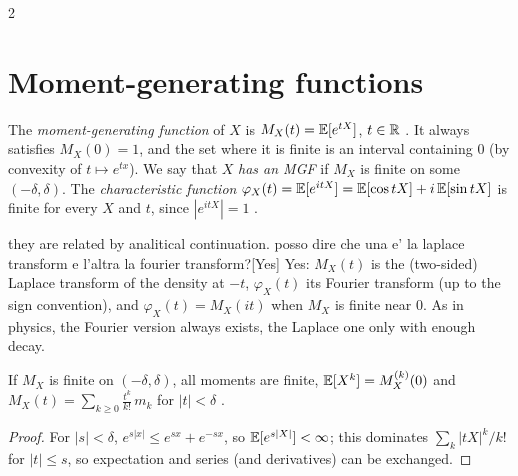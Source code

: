 \begin{paracol}{2}
\section{Moment-generating functions}\label{ch03:sec-mgf}

\begin{definition}
The \emph{moment-generating function} of $X$ is $M_X(t)=\mathbb{E}[e^{tX}]$, $t\in\mathbb{R}$ .
It always satisfies $M_X(0)=1$, and the set where it is finite is an interval containing $0$ (by
convexity of $t\mapsto e^{tx}$). We say that $X$ \emph{has an MGF} if $M_X$ is finite on some
$(-\delta,\delta)$. The \emph{characteristic function} $\varphi_X(t)=\mathbb{E}[e^{itX}]=\mathbb{E}[\cos tX]+i\,\mathbb{E}[\sin tX]$
is finite for every $X$ and $t$, since $|e^{itX}|=1$ .
\end{definition}\begin{answer}{they are related by analitical continuation. posso dire che una e' la laplace transform e l'altra la fourier transform?}[Yes]
Yes: $M_X(t)$ is the (two-sided) Laplace transform of the density at $-t$, $\varphi_X(t)$ its Fourier
transform (up to the sign convention), and $\varphi_X(t)=M_X(it)$ when $M_X$ is finite near 0. As in
physics, the Fourier version always exists, the Laplace one only with enough decay.
\end{answer}

\begin{proposition}
If $M_X$ is finite on $(-\delta,\delta)$, all moments are finite, $\mathbb{E}[X^k]=M_X^{(k)}(0)$ and
$M_X(t)=\sum_{k\ge0}\frac{t^k}{k!}\,m_k$ for $|t|<\delta$ .
\end{proposition}
\begin{proof}
For $|s|<\delta$, $e^{s|x|}\le e^{sx}+e^{-sx}$, so $\mathbb{E}[e^{s|X|}]<\infty$; this dominates $\sum_k|tX|^k/k!$ for
$|t|\le s$, so expectation and series (and derivatives) can be exchanged.
\end{proof}


\end{paracol}
